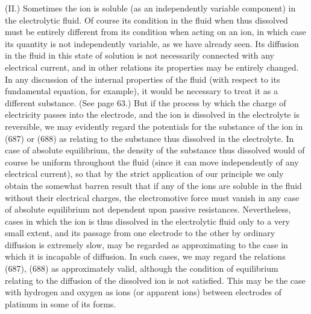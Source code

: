\documentclass[12pt]{article}
\begin{document}
(II.) Sometimes the ion is soluble (as an independently variable component) in the electrolytic fluid. Of course its condition in the fluid when thus dissolved must be entirely different from its condition when acting on an ion, in which case its quantity is not independently variable, as we have already seen. Its diffusion in the fluid in this state of solution is not necessarily connected with any electrical current, and in other relations its properties may be entirely changed. In any discussion of the internal properties of the fluid (with respect to its fundamental equation, for example), it would be necessary to treat it as a different substance. (See page 63.) But if the process by which the charge of electricity passes into the electrode, and the ion is dissolved in the electrolyte is reversible, we may evidently regard the potentials for the substance of the ion in (687) or (688) as relating to the substance thus dissolved in the electrolyte. In case of absolute equilibrium, the density of the substance thus dissolved would of course be uniform throughout the fluid (since it can move independently of any electrical current), so that by the strict application of our principle we only obtain the somewhat barren result that if any of the ions are soluble in the fluid without their electrical charges, the electromotive force must vanish in any case of absolute equilibrium not dependent upon passive resistances. Nevertheless, cases in which the ion is thus dissolved in the electrolytic fluid only to a very small extent, and its passage from one electrode to the other by ordinary diffusion is extremely slow, may be regarded as approximating to the case in which it is incapable of diffusion. In such cases, we may regard the relations (687), (688) as approximately valid, although the condition of equilibrium relating to the diffusion of the dissolved ion is not satisfied. This may be the case with hydrogen and oxygen as ions (or apparent ions) between electrodes of platinum in some of its forms.
\end{document}
